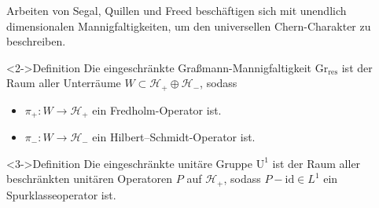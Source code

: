 \documentclass[12pt,utf8,notheorems,compress,t]{beamer}
\renewcommand{\_}{\mathpunct{.}}
\newcommand{\?}{\,{:}\,}
\begin{document}
\begin{frame}
    Arbeiten von Segal, Quillen und Freed beschäftigen sich mit unendlich
    dimensionalen Mannigfaltigkeiten, um den universellen Chern-Charakter zu
    beschreiben.
    \begin{block}<2->{Definition}
        Die eingeschränkte Gra\ss mann-Mannigfaltigkeit
        $\mathrm{Gr}_{\mathrm{res}}$ ist der Raum aller Unterräume $W\subset
        \mathcal{H}_+ \oplus \mathcal{H}_-$, sodass 
        \begin{itemize}
            \item $\pi_+\colon W\to \mathcal{H}_+$ ein Fredholm-Operator ist.
            \item $\pi_-\colon W \to \mathcal{H}_-$ ein
                Hilbert--Schmidt-Operator ist.
        \end{itemize}
    \end{block}
    \begin{block}<3->{Definition}
        Die eingeschränkte unitäre Gruppe $\mathrm U^1$ ist der Raum aller
        beschränkten
        unitären Operatoren $P$ auf $\mathcal{H}_+$, sodass $P-\mathrm{id}\in
        L^1$ ein Spurklasseoperator ist.
    \end{block}
\end{frame}
\end{document}
